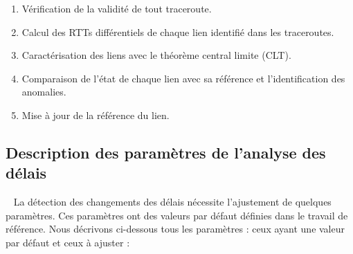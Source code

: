 \begin{enumerate}[label=(\roman*)]
	
	\item Vérification de la validité de tout traceroute.
	
	\item Calcul des RTTs différentiels de chaque lien identifié dans les traceroutes.
	
	\item Caractérisation des liens avec le théorème central limite (CLT).
	
	\item  Comparaison de l'état de chaque lien avec sa référence  et l'identification des anomalies.
	
	\item Mise à jour de la référence du lien.
\end{enumerate}

\subsection{Description des paramètres de l'analyse des délais} \label{par:parametre-de-lanalyse}~
La détection des changements des délais nécessite l'ajustement de quelques paramètres. Ces paramètres ont des valeurs par défaut  définies dans le travail de référence. Nous décrivons ci-dessous tous les paramètres : ceux ayant une valeur par défaut et ceux à ajuster :

